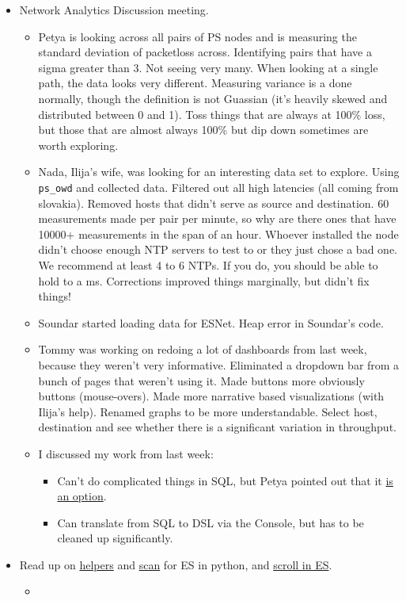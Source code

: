 \documentclass{weeklyreport}
\begin{document}
\begin{itemize}
    \item Network Analytics Discussion meeting.
    \begin{itemize}
    	\item Petya is looking across all pairs of PS nodes and is measuring the standard deviation of packetloss across. Identifying pairs that have a sigma greater than 3. Not seeing very many. When looking at a single path, the data looks very different. Measuring variance is a done normally, though the definition is not Guassian (it's heavily skewed and distributed between 0 and 1). Toss things that are always at 100\% loss, but those that are almost always 100\% but dip down sometimes are worth exploring.
    	\item Nada, Ilija's wife, was looking for an interesting data set to explore. Using \texttt{ps\_owd} and collected data. Filtered out all high latencies (all coming from slovakia). Removed hosts that didn't serve as source and destination. 60 measurements made per pair per minute, so why are there ones that have 10000+ measurements in the span of an hour. Whoever installed the node didn't choose enough NTP servers to test to or they just chose a bad one. We recommend at least 4 to 6 NTPs. If you do, you should be able to hold to a ms. Corrections improved things marginally, but didn't fix things!
    	\item Soundar started loading data for ESNet. Heap error in Soundar's code.
    	\item Tommy was working on redoing a lot of dashboards from last week, because they weren't very informative. Eliminated a dropdown bar from a bunch of pages that weren't using it. Made buttons more obviously buttons (mouse-overs). Made more narrative based visualizations (with Ilija's help). Renamed graphs to be more understandable. Select host, destination and see whether there is a significant variation in throughput.
    	\item I discussed my work from last week:
    	\begin{itemize}
    	    \item Can't do complicated things in SQL, but Petya pointed out that it \href{https://www.elastic.co/what-is/elasticsearch-sql}{is an option}.
    	    \item Can translate from SQL to DSL via the Console, but has to be cleaned up significantly.
    	\end{itemize}
    \end{itemize}

    \item Read up on \href{https://elasticsearch-py.readthedocs.io/en/master/helpers.html}{helpers} and \href{https://elasticsearch-py.readthedocs.io/en/master/helpers.html#scan}{scan} for ES in python, and \href{https://www.elastic.co/guide/en/elasticsearch/reference/master/paginate-search-results.html#scroll-search-results}{scroll in ES}.
    \begin{itemize}
		\item 
	\end{itemize}
\end{itemize}
\end{document}
